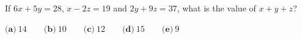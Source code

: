 If $6x+5y=28$, $x-2z=19$ and $2y+9z=37$, what is the value of $x+y+z$?

$\textbf{(a)}\ 14\qquad\textbf{(b)}\ 10\qquad\textbf{(c)}\ 12\qquad\textbf{(d)}\ 15\qquad\textbf{(e)}\ 9$
